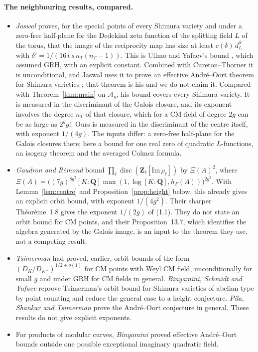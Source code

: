\documentclass[11pt,a4paper]{article}
\theoremstyle{plain}
\theoremstyle{remark}
\newcommand{\Q}{\mathbf Q}
\newcommand{\Z}{\mathbf Z}
\newcommand{\Ag}{\mathcal A_g}
\newcommand{\disc}{\operatorname{disc}}
\begin{document}
\paragraph{The neighbouring results, compared.}
\begin{itemize}
\item \emph{Jaswal} \cite[Proposition~3.3]{Jaswal} proves, for the special points of every Shimura variety and under a
zero-free half-plane for the Dedekind zeta function of the splitting field $L$ of the torus, that the image of the
reciprocity map has size at least $c(\delta)\,d_L^{\delta'}$ with $\delta'=1/(16\,t\,s\,n_T(n_T-1))$. This is
Ullmo and Yafaev's bound \cite[Theorem~6.1]{UY}, which assumed GRH, with an explicit constant. Combined with
Cureton--Thorner it is unconditional, and Jaswal uses it to prove an effective Andr\'e--Oort theorem for Shimura
varieties \cite[Theorems~1.1--1.4]{Jaswal}; that theorem is his and we do not claim it. Compared with
Theorem~\ref{thm:main} on $\Ag$, his bound covers every Shimura variety. It is measured in the discriminant of the
Galois closure, and its exponent involves the degree $n_T$ of that closure, which for a CM field of degree $2g$ can
be as large as $2^gg!$. Ours is measured in the discriminant of the centre itself, with exponent $1/(4g)$. The inputs
differ: a zero-free half-plane for the Galois closures there; here a bound for one real zero of quadratic
$L$-functions, an isogeny theorem and the averaged Colmez formula.
\item \emph{Gaudron and R\'emond} \cite[Th\'eor\`eme~1.9(5)]{GR23} bound
$\prod_\ell\disc(\Z_\ell[\mathrm{Im}\,\rho_\ell])$ by $\Xi(A)^2$, where
$\Xi(A)=\bigl((7g)^{8g^2}[K:\Q]\max(1,\log[K:\Q],h_F(A))\bigr)^{2g^2}$. With Lemma~\ref{lem:centre} and
Proposition~\ref{prop:height} below, this already gives an explicit orbit bound, with exponent $1/(4g^2)$. Their
sharper Th\'eor\`eme~1.8 gives the exponent $1/(2g)$ of (1.1). They do not state an orbit bound for CM points, and
their Proposition~13.7, which identifies the algebra generated by the Galois image, is an input to the theorem they
use, not a competing result.
\item \emph{Tsimerman} \cite{Ts12} had proved, earlier, orbit bounds of the form
$(D_K/D_{K^+})^{1/2+o(1)}$ for CM points with Weyl CM field, unconditionally for small $g$ and under GRH for CM fields
in general. \emph{Binyamini, Schmidt and Yafaev} \cite{BSY} reprove Tsimerman's orbit bound for Shimura varieties of
abelian type by point counting and reduce the general case to a height conjecture. \emph{Pila, Shankar and Tsimerman}
\cite{PST} prove the Andr\'e--Oort conjecture in general. These results do not give explicit exponents.
\item For products of modular curves, \emph{Binyamini} \cite{Bin20} proved effective Andr\'e--Oort bounds outside one
possible exceptional imaginary quadratic field.
\end{itemize}
\end{document}

